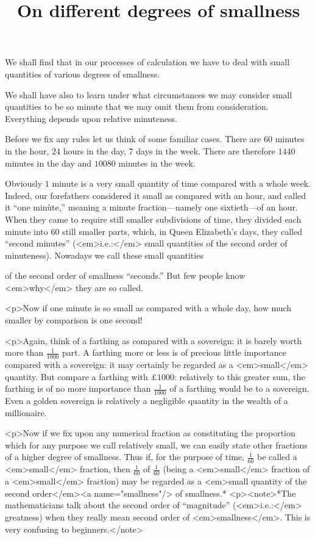 \documentclass{ximera}
\title{On different degrees of smallness}
\begin{document}
\begin{abstract}
\end{abstract}
\maketitle

We shall find that in our processes of calculation we
have to deal with small quantities of various degrees
of smallness.

We shall have also to learn under what circumstances
we may consider small quantities to be so minute
that we may omit them from consideration. Everything
depends upon relative minuteness.

Before we fix any rules let us think of some
familiar cases. There are $60$ minutes in the hour,
$24$ hours in the day, $7$ days in the week. There are
therefore $1440$ minutes in the day and $10080$ minutes
in the week.

Obviously $1$ minute is a very small quantity of
time compared with a whole week. Indeed, our
forefathers considered it small as compared with an
hour, and called it ``one minùte,'' meaning a minute
fraction---namely one sixtieth---of an hour. When
they came to require still smaller subdivisions of time,
they divided each minute into $60$ still smaller parts,
which, in Queen Elizabeth's days, they called “second
minutes” (<em>i.e.:</em> small quantities of the second order of
minuteness). Nowadays we call these small quantities

of the second order of smallness “seconds.” But few
people know <em>why</em> they are so called.

<p>Now if one minute is so small as compared with a
whole day, how much smaller by comparison is one
second!

<p>Again, think of a farthing as compared with a
sovereign: it is barely worth more than $\frac{1}{1000}$ part.
A farthing more or less is of precious little importance
compared with a sovereign: it may certainly be regarded
as a <em>small</em> quantity. But compare a farthing
with £$1000$: relatively to this greater sum, the
farthing is of no more importance than $\frac{1}{1000}$ of a
farthing would be to a sovereign. Even a golden
sovereign is relatively a negligible quantity in the
wealth of a millionaire.

<p>Now if we fix upon any numerical fraction as
constituting the proportion which for any purpose
we call relatively small, we can easily state other
fractions of a higher degree of smallness. Thus if,
for the purpose of time, $\frac{1}{60}$ be called a <em>small</em> fraction,
then $\frac{1}{60}$ of $\frac{1}{60}$ (being a <em>small</em> fraction of a <em>small</em>
fraction) may be regarded as a <em>small quantity of the
second order</em><a name="smallness"/> of smallness.*
<p><note>*The mathematicians talk about the second order of “magnitude”
  (<em>i.e.:</em> greatness) when they really mean second order of <em>smallness</em>.
  This is very confusing to beginners.</note>
\end{document}
